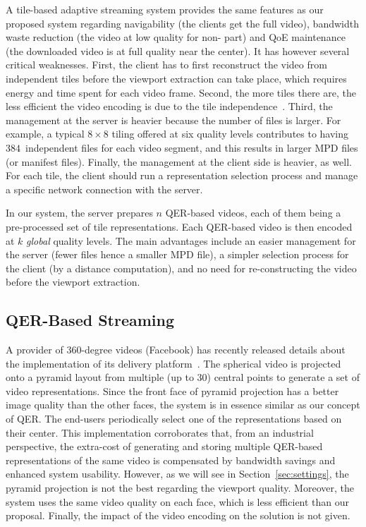 A tile-based adaptive streaming system provides the same features as
our proposed system regarding navigability (the clients get the full
video), bandwidth waste reduction (the video at low quality for
non-\FoV{} part) and \ac{QoE} maintenance (the downloaded video is
at full quality near the \FoV{} center). It has however several
critical weaknesses. First, the client has to first reconstruct the
video from independent tiles before the viewport extraction can take
place, which requires energy and time spent for each video frame.
Second, the more tiles there are, the less efficient the video
encoding is due to the tile
independence~\cite{sanchez_compressed_2015}. Third, the management at
the server is heavier because the number of files is larger. For
example, a typical $8\times8$ tiling offered at six quality levels
contributes to having $384$~independent files for each video segment,
and this results in larger \ac{MPD} files (or manifest
files). Finally, the management at the client side is heavier, as
well. For each tile, the client should run a representation selection
process and manage a specific network connection with the server.

In our system, the server
prepares $n$ \ac{QER}-based videos, each of them being a
pre-processed set of tile representations. Each \ac{QER}-based video is then
encoded at $k$ \emph{global} quality levels.
The main advantages include
an easier management for the server (fewer files hence a smaller
\ac{MPD} file), a simpler selection process for the client (by a
distance computation), and no need for re-constructing the video before
the viewport extraction.

\subsection{\acs{QER}-Based Streaming}

A  provider of $360$-degree videos (Facebook) has recently
released details about the implementation of its delivery
platform~\cite{facebook}.
The spherical video is projected onto a pyramid layout from multiple
(up to $30$) central points to generate a set of video representations.
Since the
front face of pyramid projection has a better image quality than the other faces, the
system is in essence similar as our concept of \ac{QER}. The end-users
periodically select one of the representations
based on their \FoV{} center. This implementation
corroborates that, from an industrial perspective, the extra-cost of
generating and storing multiple \ac{QER}-based representations of the
same video is compensated by bandwidth savings and
enhanced system usability.
However, as we will see in Section~\ref{sec:settings}, the pyramid projection is not
the best regarding the viewport quality. Moreover, the system
uses the same video quality on each face, which is less
efficient than our proposal. Finally, the impact of the video encoding on the solution
is not given.

